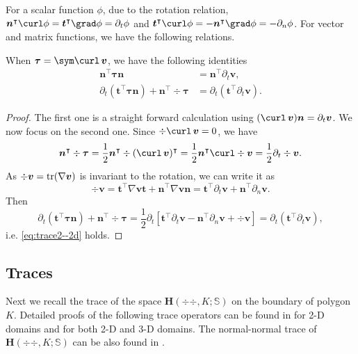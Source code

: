 For a scalar function $\phi$, due to the rotation relation, $\boldsymbol  n^{\intercal} \curl \phi = \boldsymbol  t^{\intercal} \grad \phi =  \partial_t \phi$ and $\boldsymbol  t^{\intercal} \curl \phi = -\boldsymbol  n^{\intercal} \grad \phi = -\partial_n \phi$. For vector and matrix functions, we have the following relations.
\begin{lemma}\label{lm:tauv}
When $\boldsymbol  \tau = \sym\curl \, \boldsymbol  v$, we have the following identities
\begin{align}
\label{eq:trace1} \boldsymbol  n^{\intercal}\boldsymbol \tau\boldsymbol  n &= \boldsymbol  n^{\intercal} \partial_t \boldsymbol  v,\\
\label{eq:trace2--2d} \partial_{t}(\boldsymbol  t^{\intercal}\boldsymbol \tau\boldsymbol  n)+\boldsymbol  n^{\intercal}\div\boldsymbol \tau & =  \partial_t(\boldsymbol  t^{\intercal}\partial_t\boldsymbol  v).
\end{align}
\end{lemma}
\begin{proof}
The first one is a straight forward calculation using $(\curl \, \boldsymbol  v)\boldsymbol n =  \partial_t \boldsymbol  v$. We now focus on the second one.
Since $\div \curl \, \boldsymbol  v = 0$, we have
$$\boldsymbol  n^{\intercal}\div\boldsymbol \tau  = \frac{1}{2}\boldsymbol  n^{\intercal} \div (\curl \, \boldsymbol  v)^{\intercal} = \frac{1}{2}\boldsymbol  n^{\intercal} \curl \div \boldsymbol  v =  \frac{1}{2} \partial_t \div \boldsymbol  v.$$
As $\div \boldsymbol  v = {\rm tr} (\nabla \boldsymbol  v)$ is invariant to the rotation, we can write it as
$$
\div \boldsymbol  v = \boldsymbol  t^{\intercal}\nabla \boldsymbol  v \boldsymbol  t + \boldsymbol  n^{\intercal}\nabla \boldsymbol  v \boldsymbol  n =  \boldsymbol  t^{\intercal}\partial_t\boldsymbol  v + \boldsymbol  n^{\intercal}\partial_n\boldsymbol  v.
$$
Then
$$
 \partial_{t}(\boldsymbol  t^{\intercal}\boldsymbol \tau\boldsymbol  n)+\boldsymbol  n^{\intercal}\div\boldsymbol \tau  =\frac{1}{2}\partial_t[  \boldsymbol  t^{\intercal}\partial_t\boldsymbol  v -  \boldsymbol  n^{\intercal}\partial_n\boldsymbol  v + \div\boldsymbol  v]  =  \partial_t  (\boldsymbol  t^{\intercal}\partial_t\boldsymbol  v),
 $$
 i.e. \eqref{eq:trace2--2d} holds.
\end{proof}

\subsection{Traces}
Next we recall the trace of the space $\boldsymbol{H}(\div{\div },K; \mathbb{S})$ on the boundary of polygon $K$. {Detailed proofs of the following trace operators can be found in \cite[Theorem 2.2]{Amara;Capatina-Papaghiuc;Chatti:2002Bending} for 2-D domains and \cite[Lemma 3.2]{Fuhrer;Heuer;Niemi:2019ultraweak} for both 2-D and 3-D domains.} The normal-normal trace of $\boldsymbol{H}(\div{\div },K; \mathbb{S})$ can be also found in \cite{Sinwel2009,PechsteinSchoeberl2018}.

